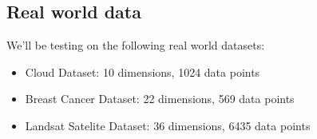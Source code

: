 \documentclass[a4paper]{article}
\begin{document}
\subsection{Real world data}
We'll be testing on the following real world datasets:

\begin{itemize}
    \item Cloud Dataset: 10 dimensions, 1024 data points
    \item Breast Cancer Dataset: 22 dimensions, 569 data points
    \item Landsat Satelite Dataset: 36 dimensions, 6435 data points
\end{itemize}

\begin{table}
\begin{center}
    
\caption{PSO EM reinit and EM with random init algos comparison}
\label{table:time_table}

\end{center}
\end{table}
\end{document}
